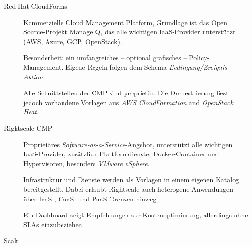\begin{description}
	
	\item[Red Hat CloudForms\footnotemark]
	Kommerzielle Cloud Management Platform, Grundlage ist das Open Source-Projekt  ManageIQ\footnotemark{}, das alle wichtigen IaaS-Provider unterstützt (AWS, Azure, GCP, OpenStack).	
	
	Besonderheit: ein umfangreiches -- optional grafisches -- Policy-Management. Eigene Regeln folgen dem Schema \emph{Bedingung/Ereignis-Aktion}.
	
	Alle Schnittstellen der CMP sind proprietär. Die Orchestrierung liest jedoch vorhandene Vorlagen aus \emph{AWS CloudFormation} and \emph{OpenStack Heat}.
	
	\item[Rightscale CMP\footnotemark]
	Proprietäres \emph{Software-as-a-Service}-Angebot, unterstützt alle wichtigen IaaS-Provider, zusätzlich Plattformdienste, Docker-Container und Hypervisoren, besonders \emph{VMware vSphere}.
	
	Infrastruktur und Dienste werden als Vorlagen in einem eigenen Katalog bereitgestellt. Dabei erlaubt Rightscale auch heterogene Anwendungen über IaaS-, CaaS- und PaaS-Grenzen hinweg.
	
	Ein Dashboard zeigt Empfehlungen zur Kostenoptimierung, allerdings ohne SLAs einzubeziehen.
	
	\item[Scalr] 

\end{description}





%
%

%
%
%
%
%


